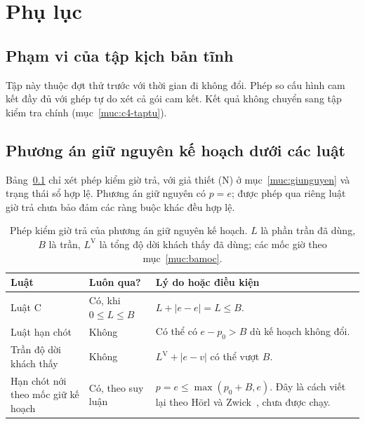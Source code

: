 \appendix
\chapter*{Phụ lục}
\renewcommand{\thesection}{\Alph{section}}
\renewcommand{\thetable}{\thesection.\arabic{table}}
\renewcommand{\theHsection}{appendix.\Alph{section}}
\renewcommand{\theHtable}{appendix.\Alph{section}.\arabic{table}}

\section{Phạm vi của tập kịch bản tĩnh}
\label{phuluc:A}

Tập này thuộc đợt thử trước với thời gian đi không đổi. Phép so cấu hình cam kết đầy đủ với ghép tự do xét cả gói cam kết. Kết quả không chuyển sang tập kiểm tra chính (mục~\ref{muc:c4-taptu}).

\section{Phương án giữ nguyên kế hoạch dưới các luật}
\label{phuluc:B}
\setcounter{table}{0}

Bảng~\ref{bang:pl-giunguyen} chỉ xét phép kiểm giờ trả, với giả thiết (N) ở mục~\ref{muc:giunguyen} và trạng thái sổ hợp lệ. Phương án giữ nguyên có $p=e$; được phép qua riêng luật giờ trả chưa bảo đảm các ràng buộc khác đều hợp lệ.

\begin{table}[htbp]
\centering
\caption{Phép kiểm giờ trả của phương án giữ nguyên kế hoạch. $L$ là phần trần đã dùng, $B$ là trần, $L^{\mathrm{V}}$ là tổng độ dời khách thấy đã dùng; các mốc giờ theo mục~\ref{muc:bamoc}.}
\label{bang:pl-giunguyen}
\begin{tabular}{@{}p{3.5cm}p{3.1cm}p{8.4cm}@{}}
\toprule
\textbf{Luật} & \textbf{Luôn qua?} & \textbf{Lý do hoặc điều kiện} \\
\midrule
Luật C & Có, khi $0\le L\le B$ & $L+|e-e|=L\le B$. \\
Luật hạn chót & Không & Có thể có $e-p_0>B$ dù kế hoạch không đổi. \\
Trần độ dời khách thấy & Không & $L^{\mathrm{V}}+|e-v|$ có thể vượt $B$. \\
Hạn chót nới theo mốc giữ kế hoạch & Có, theo suy luận & $p=e\le\max(p_0+B,e)$. Đây là cách viết lại theo Hörl và Zwick~\cite{horl2022}, chưa được chạy. \\
\bottomrule
\end{tabular}
\end{table}

